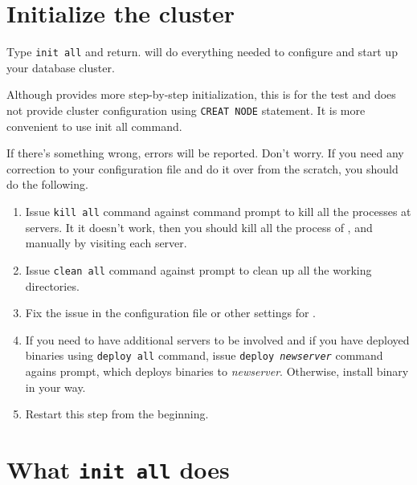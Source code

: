 
\section{Initialize the cluster}

  Type \texttt{init all} and return.
   will do everything needed to configure and start up your \XC{}
  database cluster.
  
  Although  provides more step-by-step initialization,
  this is for the test and does not provide cluster configuration using \texttt{CREAT NODE}
  statement.
  It is more convenient to use init all command.
  
  If there's something wrong, errors will be reported.
  Don't worry.
  If you need any correction to your configuration file and do it over from the scratch,
  you should do the following.
  
  \begin{enumerate}
	  \item Issue \texttt{kill all} command against  command prompt to kill all the
	  		processes at servers.
		    It it doesn't work, then you should kill all the process of ,  and
			 manually by visiting each server.
	  \item Issue \texttt{clean all} command against  prompt to clean up all the working directories.
	  \item Fix the issue in the configuration file or other settings for .
	  \item If you need to have additional servers to be involved and if you have deployed \XC{} binaries using
	  		\texttt{deploy all} command, issue \texttt{deploy \textit{newserver}} command agains  prompt,
			which deploys \XC{} binaries to \textit{newserver}.
			Otherwise, install \XC{} binary in your way.
	  \item Restart this step from the beginning.
  \end{enumerate}



\section{What {\tt init all} does}

